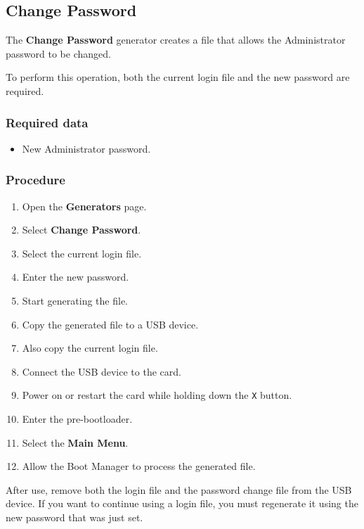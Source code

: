 ﻿\documentclass[11pt,a4paper]{article}
\newcommand{\button}[1]{\textbf{#1}}
\begin{document}
\subsection{Change Password}

The \button{Change Password} generator creates a file that allows
the Administrator password to be changed.

To perform this operation, both the current login file and the new
password are required.

\subsubsection*{Required data}

\begin{itemize}
    \item New Administrator password.
\end{itemize}

\subsubsection*{Procedure}

\begin{enumerate}
    \item Open the \button{Generators} page.
    \item Select \button{Change Password}.
    \item Select the current login file.
    \item Enter the new password.
    \item Start generating the file.
    \item Copy the generated file to a USB device.
    \item Also copy the current login file.
    \item Connect the USB device to the card.
    \item Power on or restart the card while holding down
    the \texttt{X} button.
    \item Enter the pre-bootloader.
    \item Select the \textbf{Main Menu}.
    \item Allow the Boot Manager to process the generated file.
\end{enumerate}

After use, remove both the login file and the password change file
from the USB device. If you want to continue using a login file,
you must regenerate it using the new password that was just set.
\end{document}
